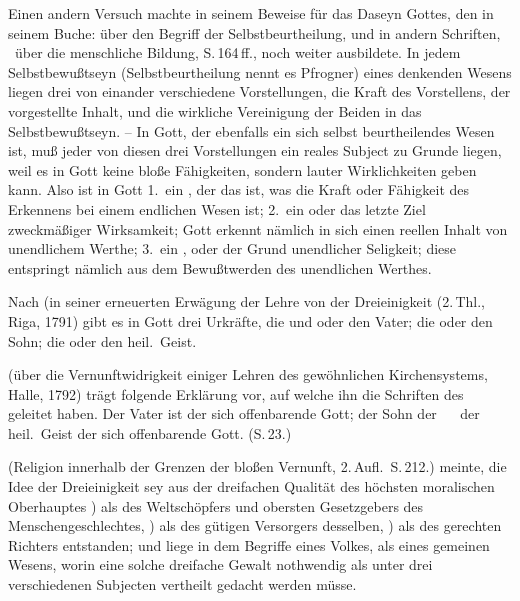 \begin{aufza}
\begin{aufzb}
\item Einen andern Versuch machte  in seinem Beweise für das Daseyn Gottes, den  in seinem Buche: über den Begriff der Selbstbeurtheilung, und in andern Schriften, \zB\ über die menschliche Bildung, S.\,164\,ff., noch weiter ausbildete. In jedem Selbstbewußtseyn (Selbstbeurtheilung nennt es Pfrogner) eines denkenden Wesens liegen drei von einander verschiedene Vorstellungen, die Kraft des Vorstellens, der vorgestellte Inhalt, und die wirkliche Vereinigung der Beiden in das Selbstbewußtseyn. -- In Gott, der ebenfalls ein sich selbst beurtheilendes Wesen ist, muß jeder von diesen drei Vorstellungen ein reales Subject zu Grunde liegen, weil es in Gott keine bloße Fähigkeiten, sondern lauter Wirklichkeiten geben kann. Also ist in Gott 1.~ein , der das ist, was die Kraft oder Fähigkeit des Erkennens bei einem endlichen Wesen ist; 2.~ein  oder das letzte Ziel zweckmäßiger Wirksamkeit; Gott erkennt nämlich in sich einen reellen Inhalt von unendlichem Werthe; 3.~ein , oder der Grund unendlicher Seligkeit; diese entspringt nämlich aus dem Bewußtwerden des unendlichen Werthes.
\item Nach  (in seiner erneuerten Erwägung der Lehre von der Dreieinigkeit (2.\,Thl., Riga, 1791) gibt es in Gott drei Urkräfte, die  und  oder den Vater; die  oder den Sohn; die  oder den heil.\ Geist.
\item {} (über die Vernunftwidrigkeit einiger Lehren des gewöhnlichen Kirchensystems, Halle, 1792) trägt folgende Erklärung vor, auf welche ihn die Schriften des  geleitet haben. Der Vater ist der sich offenbarende Gott; der Sohn der ~\  der heil.\ Geist der  sich offenbarende Gott. (S.\,23.)
\item {} (Religion innerhalb der Grenzen der bloßen Vernunft, 2.\,Aufl.\ S.\,212.) meinte, die Idee der Dreieinigkeit sey aus der dreifachen Qualität des höchsten moralischen Oberhauptes ) als des Weltschöpfers und obersten Gesetzgebers des Menschengeschlechtes, ) als des gütigen Versorgers desselben, ) als des gerechten Richters entstanden; und liege in dem Begriffe eines Volkes, als eines gemeinen Wesens, worin eine solche dreifache Gewalt nothwendig als unter drei verschiedenen Subjecten vertheilt gedacht werden müsse.

\end{aufzb}
\end{aufza}
